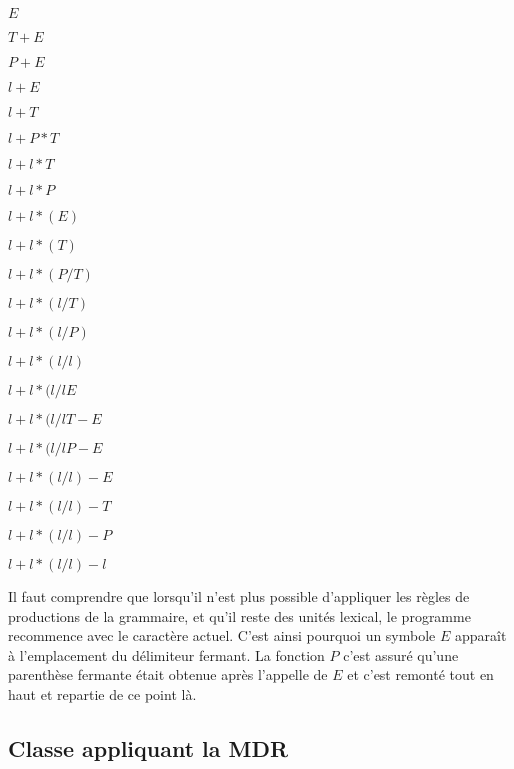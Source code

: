 \begin{center}
\begin{minipage}{0.8\textwidth}
  \begin{enumerate}
    \setlength{\itemsep}{0pt}
    \setlength{\parskip}{0pt}
    \begin{multicols}{2}
      \item $E$
      \item $T+E$
      \item $P+E$
      \item $l+E$
      \item $l+T$
      \item $l+P*T$
      \item $l+l*T$
      \item $l+l*P$
      \item $l+l*(E)$
      \item $l+l*(T)$
      \item $l+l*(P/T)$
      \item $l+l*(l/T)$
      \item $l+l*(l/P)$
      \item $l+l*(l/l)$
      \item $l+l*(l/lE$
      \item $l+l*(l/lT-E$
      \item $l+l*(l/lP-E$
      \item $l+l*(l/l)-E$
      \item $l+l*(l/l)-T$
      \item $l+l*(l/l)-P$
      \item $l+l*(l/l)-l$
    \end{multicols}
  \end{enumerate}
\end{minipage}
\end{center}

Il faut comprendre que lorsqu'il n'est plus possible d'appliquer les règles
de productions de la grammaire, et qu'il reste des unités lexical, le
programme recommence avec le caractère actuel. C'est ainsi pourquoi un
symbole $E$ apparaît à l'emplacement du délimiteur fermant. La fonction $P$
c'est assuré qu'une parenthèse fermante était obtenue après l'appelle de $E$
et c'est remonté tout en haut et repartie de ce point là.

\subsection{Classe appliquant la MDR}
